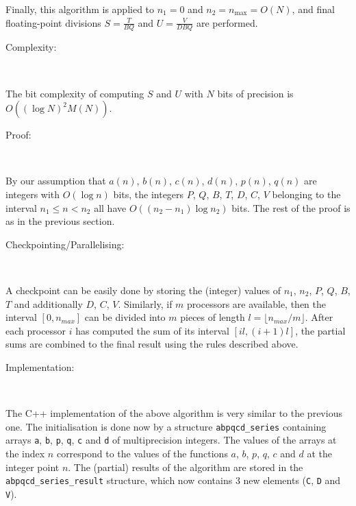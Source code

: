 Finally, this algorithm is applied to \( n_{1}=0 \) and 
\( n_{2}=n_{\max}=O(N) \), and final floating-point divisions 
\( S=\frac{T}{BQ} \) and  \( U=\frac{V}{DBQ} \) are performed.

\begin{description}
\item [Complexity:]~
\end{description}

The bit complexity of computing  \( S \) and  \( U \) with  \( N \) bits of
precision is \( O((\log N)^{2}M(N)) \).

\begin{description}
\item [Proof:]~
\end{description}

By our assumption that  \( a(n) \),  \( b(n) \),  \( c(n) \),  \( d(n) \),  
\( p(n) \),  \( q(n) \) are integers with  \( O(\log n) \) bits,
the integers  \( P \),  \( Q \),  \( B \),  \( T \),  \( D \),  \( C \),  
\( V \) belonging to the interval  \( n_{1}\leq n<n_{2} \) all have
 \( O((n_{2}-n_{1})\log n_{2}) \) bits. The rest of the proof is as in the 
previous section.

\begin{description}
\item [Checkpointing/Parallelising:]~
\end{description}

A checkpoint can be easily done by storing the (integer) values of
\( n_1 \),  \( n_2 \), \( P \),  \( Q \),  \( B \), \( T \) and additionally
\( D \),  \( C \),  \( V \). Similarly, if \( m \) processors are available,
then the interval \( [0,n_{max}] \) can be divided into \( m \) pieces of
length \( l = \lfloor n_{max}/m \rfloor \). After each processor \( i \) has
computed the sum of its interval \( [il,(i+1)l] \), the partial sums are
combined to the final result using the rules described above.

\begin{description}
\item [Implementation:]~
\end{description}

The C++ implementation of the above algorithm is very similar
to the previous one. The initialisation is done now by a structure 
{\tt abpqcd\_series} containing arrays {\tt a}, {\tt b}, {\tt p},
{\tt q}, {\tt c} and {\tt d} of multiprecision integers. The values of
the arrays at the index \( n \) correspond to the values of the functions
\( a \), \( b \), \( p \), \( q \), \( c \) and \( d \) at the integer point
\( n \). The (partial) results of the algorithm are stored in the
{\tt abpqcd\_series\_result} structure, which now contains 3 new elements
({\tt C}, {\tt D} and {\tt V}).

